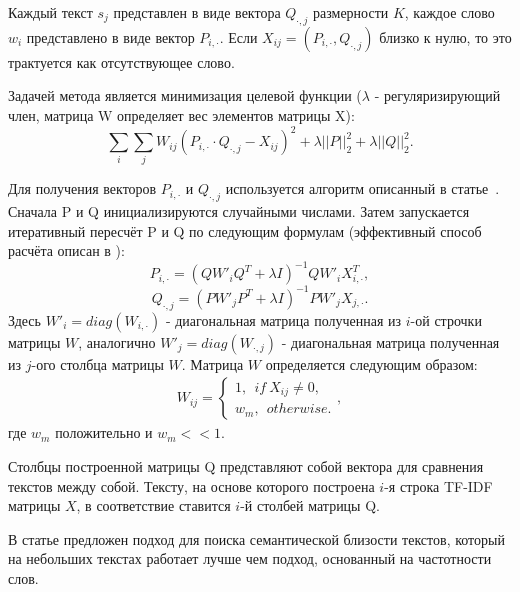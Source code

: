         Каждый текст $s_j$ представлен в виде вектора $Q_{\cdot,j}$ размерности $K$, каждое слово $w_i$ представлено в виде вектор $P_{i,\cdot}$.
        Если $X_{ij}=(P_{i,\cdot}, Q_{\cdot,j})$ близко к нулю, то это трактуется как отсутствующее слово.

        Задачей метода является минимизация целевой функции ($\lambda$ - регуляризирующий член, матрица W определяет вес элементов матрицы X):
        \begin{equation}
            \sum_i \sum_j W_{ij} (P_{i,\cdot} \cdot Q_{\cdot,j} - X_{ij})^2 + \lambda ||P||^2_2 + \lambda ||Q||^2_2.
        \end{equation}

        Для получения векторов $P_{i,\cdot}$ и $Q_{\cdot,j}$ используется алгоритм описанный в статье~\cite{matrix_approximation}.
        Сначала P и Q инициализируются случайными числами. Затем запускается итеративный пересчёт P и Q по следующим формулам (эффективный способ расчёта описан в \cite{steck_recommender}):
        \begin{equation}
            P_{i, \cdot} = (Q W'_i Q^T + \lambda I)^{-1} Q W'_i X_{i,\cdot}^T,
        \end{equation}
        \begin{equation}
            Q_{\cdot, j} = (P W'_j P^T + \lambda I)^{-1} P W'_j X_{j,\cdot}.
        \end{equation}
        Здесь $W'_i = diag(W_{i, \cdot})$ - диагональная матрица полученная из $i$-ой строчки матрицы $W$,
        аналогично $W'_j = diag(W_{\cdot, j})$ - диагональная матрица полученная из $j$-ого столбца матрицы $W$.
        Матрица $W$ определяется следующим образом:
        \begin{gather}
            W_{ij} =
            \begin{cases}
                1, ~~if~X_{ij} \neq 0, \nonumber \\
                w_m, ~~otherwise.
            \end{cases},
        \end{gather}
        где $w_m$ положительно и $w_m << 1$.

        Столбцы построенной матрицы Q представляют собой вектора для сравнения текстов между собой.
        Тексту, на основе которого построена $i$-я строка TF-IDF матрицы $X$, в соответствие ставится $i$-й столбей матрицы Q.

        В статье предложен подход для поиска семантической близости текстов, который на небольших текстах работает лучше чем подход, основанный на частотности слов.

